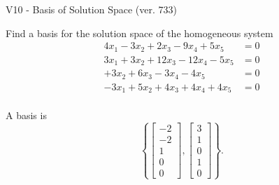 \begin{exercise}
  \begin{exerciseTitle}V10 - Basis of Solution Space (ver. 733)\end{exerciseTitle}
  \begin{exerciseStatement}
    Find a basis for the solution space of the homogeneous system 
\begin{align*}
 4 x_ 1 -3 x_ 2 + 2 x_ 3 -9 x_ 4 + 5 x_ 5 &= 0  \\ 
  3 x_ 1 + 3 x_ 2 + 12 x_ 3 -12 x_ 4 -5 x_ 5 &= 0  \\ 
  + 3 x_ 2 + 6 x_ 3 -3 x_ 4 -4 x_ 5 &= 0  \\ 
  -3 x_ 1 + 5 x_ 2 + 4 x_ 3 + 4 x_ 4 + 4 x_ 5 &= 0  \\ 
 \end{align*}


 
  \end{exerciseStatement}

  \begin{exerciseAnswer}
   A basis is   
\[\left\{\left[\begin{array}{c}
-2 \\
-2 \\
1 \\
0 \\
0
\end{array}\right] , \left[\begin{array}{c}
3 \\
1 \\
0 \\
1 \\
0
\end{array}\right]\right\}.\]

  


  \end{exerciseAnswer}
\end{exercise}